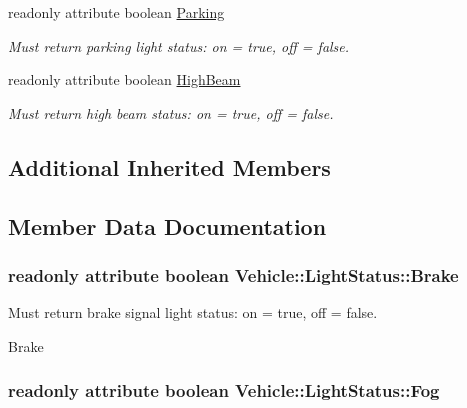 \begin{DoxyCompactItemize}
readonly attribute boolean \hyperlink{interfaceVehicle_1_1LightStatus_ac5a9edd74677a136360befca0dcff739}{Parking}
\begin{DoxyCompactList}\small\item\em Must return parking light status\-: on = true, off = false. \end{DoxyCompactList}\item 
readonly attribute boolean \hyperlink{interfaceVehicle_1_1LightStatus_a025992fe8ae85894b3042d882a3ee73e}{High\-Beam}
\begin{DoxyCompactList}\small\item\em Must return high beam status\-: on = true, off = false. \end{DoxyCompactList}\end{DoxyCompactItemize}
\subsection*{Additional Inherited Members}


\subsection{Member Data Documentation}
\hypertarget{interfaceVehicle_1_1LightStatus_aa4bf3545245f92917c7719c3b90f53da}{
\subsubsection[{Brake}]{\setlength{\rightskip}{0pt plus 5cm}readonly attribute boolean Vehicle\-::\-Light\-Status\-::\-Brake}}\label{interfaceVehicle_1_1LightStatus_aa4bf3545245f92917c7719c3b90f53da}


Must return brake signal light status\-: on = true, off = false. 

Brake \hypertarget{interfaceVehicle_1_1LightStatus_a615c415bc6fa17cda0be239e6517b6d7}{
\subsubsection[{Fog}]{\setlength{\rightskip}{0pt plus 5cm}readonly attribute boolean Vehicle\-::\-Light\-Status\-::\-Fog}}\label{interfaceVehicle_1_1LightStatus_a615c415bc6fa17cda0be239e6517b6d7}


